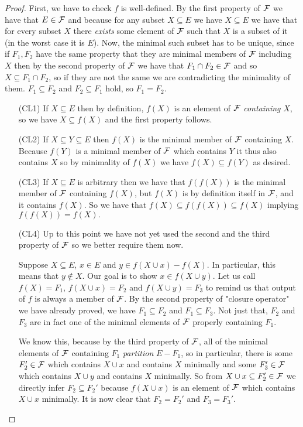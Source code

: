 \begin{proof}
    First, we have to check $f$ is well-defined. By the first property of $\mathcal{F}$ we have that $E \in \mathcal{F}$ and because for any subset $X \subseteq E$ we have $X \subseteq E$ we have that for every subset $X$ there \textit{exists} some element of $\mathcal{F}$ such that $X$ is a subset of it (in the worst case it is $E$). Now, the minimal such subset has to be unique, since if $F_1, F_2$ have the same property that they are minimal members of $\mathcal{F}$ including $X$ then by the second property of $\mathcal{F}$ we have that $F_1 \cap F_2 \in \mathcal{F}$ and so $X \subseteq F_1\cap F_2$, so if they are not the same we are contradicting the minimality of them. $ F_1 \subseteq F_2$ and $F_2 \subseteq F_1$ hold, so $F_1 = F_2.$


\begin{enumerate}
    \item[(CL1)] If $X \subseteq E$ then by definition, $f(X)$ is an element of $\mathcal{F}$ \textit{containing} $X$, so we have $X \subseteq f(X)$ and the first property follows.
    
    \item[(CL2)] If $X \subseteq Y \subseteq E$ then $f(X)$ is the minimal member of $\mathcal{F}$ containing $X$. Because $f(Y)$ is a minimal member of $\mathcal{F}$ which contains $Y$ it thus also contains $X$ so by minimality of $f(X)$ we have $f(X)\subseteq f(Y)$ as desired.

    \item[(CL3)] If $X \subseteq E$ is arbitrary then we have that $f(f(X))$ is the minimal member of $\mathcal{F}$ containing $f(X)$, but $f(X)$ is by definition itself in $\mathcal{F}$, and it contains $f(X)$. So we have that $f(X) \subseteq f(f(X)) \subseteq f(X)$ implying $f(f(X)) = f(X).$

    \item[(CL4)] Up to this point we have not yet used the second and the third property of $\mathcal{F}$ so we better require them now.

     Suppose $X \subseteq E$, $x \in E$ and $y \in f(X \cup x) - f(X)$. In particular, this means that $y \notin X$.
   Our goal is to show $x \in f(X \cup y)$. Let us call $f(X) = F_1$, $f(X \cup x) = F_2$ and $f(X \cup y) = F_3$ to remind us that output of $f$ is always a member of $\mathcal{F}$. By the second property of "closure operator" we have already proved, we have $F_1 \subseteq F_2$ and $F_1 \subseteq F_3$. Not just that, $F_2$ and $F_3$ are in fact one of the minimal elements of $\mathcal{F}$ properly containing $F_1$.

     We know this, because by the third property of $\mathcal{F}$, all of the minimal elements of $\mathcal{F}$ containing $F_1$ \textit{partition} $E-F_1$, so in particular, there is some $F_2' \in \mathcal{F}$ which contains $X\cup x$ and contains $X$ minimally and some $F_3' \in \mathcal{F}$ which contains $X \cup y$ and contains $X$ minimally. So from $X \cup x \subseteq F_2' \in \mathcal{F}$ we directly infer $F_2 \subseteq F_2'$ because $f(X \cup x)$ is an element of $\mathcal{F}$ which contains $X \cup x$ minimally. It is now clear that $F_2= F_2'$ and $F_3 = F_3'$.



\end{enumerate}
\end{proof}
